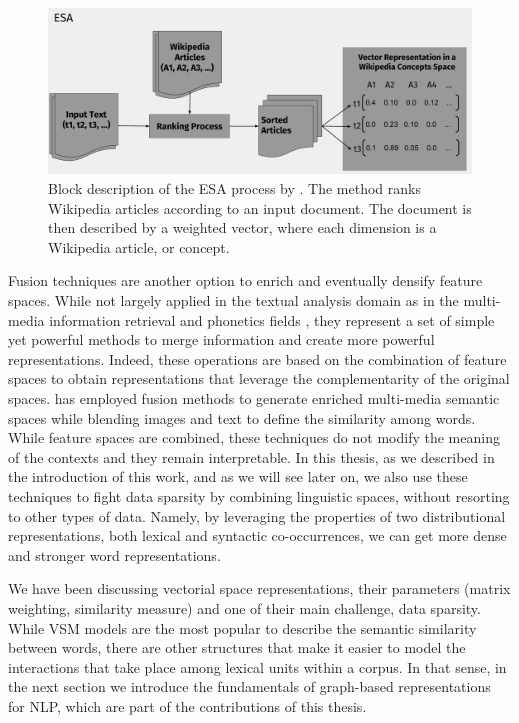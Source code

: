 \begin{figure}
\centering
\includegraphics[width=\linewidth]{images/Chapitre2/esa.pdf}
\caption{Block description of the ESA process by \cite{gabrilovich2007computing}. The method ranks Wikipedia articles according to an input document. The document is then described by a weighted vector, where each dimension is a Wikipedia article, or concept.}
\label{fig:esa}
\end{figure}

Fusion techniques are another option to enrich and eventually densify feature spaces.  While not largely applied in the textual analysis domain as in the multi-media information retrieval and phonetics fields \cite{ozkan2010latent,Ah-PineCC15}, they represent a set of simple yet powerful methods to merge information and create more powerful representations. Indeed, these operations are based on the combination of feature spaces  to obtain representations that leverage the complementarity of the original spaces. \cite{bruni2014multimodal} has employed fusion methods to generate enriched multi-media semantic spaces while blending images and text to define the similarity among words. While feature spaces are combined, these techniques do not modify the meaning of the contexts and they remain interpretable. In this thesis, as we described in the introduction of this work, and as we will see later on, we also use these techniques to fight data sparsity by combining linguistic spaces, without resorting to other types of data. Namely,  by leveraging the properties of two distributional representations, both lexical and syntactic co-occurrences, we can get more dense and stronger  word representations. 


We have been discussing vectorial space representations, their parameters (matrix weighting, similarity measure) and one of their main challenge, data sparsity. While VSM models are the most popular to describe the semantic similarity between words, there are other structures that make it easier to  model the interactions that take place among lexical units within a corpus. In that sense, in the next section we introduce the fundamentals of graph-based representations for NLP, which are part of the contributions of this thesis.

